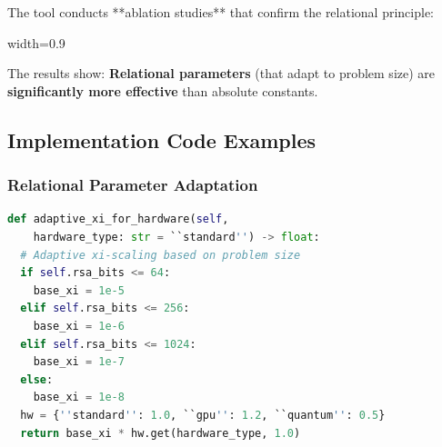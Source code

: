 	The tool conducts **ablation studies** that confirm the relational principle:
	
	\begin{table}[htbp]
		\centering
		\begin{adjustbox}{width=0.9\textwidth}
		\end{adjustbox}
		\caption{Empirical validation: Relational vs. absolute $\xi$-parameters}
		\label{tab:xi_validation}
	\end{table}
	
	The results show: \textbf{Relational parameters} (that adapt to problem size) are \textbf{significantly more effective} than absolute constants.
	
	\subsection{Implementation Code Examples}
	
	\subsubsection{Relational Parameter Adaptation}
	\begin{lstlisting}[language=Python,breaklines=true,frame=none,basicstyle=\scriptsize\ttfamily]
def adaptive_xi_for_hardware(self, 
    hardware_type: str = ``standard'') -> float:
  # Adaptive xi-scaling based on problem size
  if self.rsa_bits <= 64:
    base_xi = 1e-5
  elif self.rsa_bits <= 256:
    base_xi = 1e-6
  elif self.rsa_bits <= 1024:
    base_xi = 1e-7
  else:
    base_xi = 1e-8
  hw = {''standard'': 1.0, ``gpu'': 1.2, ``quantum'': 0.5}
  return base_xi * hw.get(hardware_type, 1.0)
	\end{lstlisting}
	
